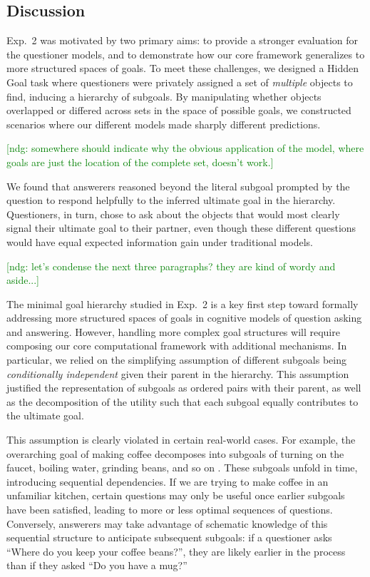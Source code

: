 \documentclass[11pt, floatsintext]{apa6}
\newcommand{\ndg}[1]{\textcolor{Green}{[ndg: #1]}}
\begin{document}
\subsection{Discussion}

Exp.~2 was motivated by two primary aims: to provide a stronger evaluation for the questioner models, and to demonstrate how our core framework generalizes to more structured spaces of goals.
To meet these challenges, we designed a Hidden Goal task where questioners were privately assigned a set of \emph{multiple} objects to find, inducing a hierarchy of subgoals.
By manipulating whether objects overlapped or differed across sets in the space of possible goals, we constructed scenarios where our different models made sharply different predictions. 

\ndg{somewhere should indicate why the obvious application of the model, where goals are just the location of the complete set, doesn't work.}

We found that answerers reasoned beyond the literal subgoal prompted by the question to respond helpfully to the inferred ultimate goal in the hierarchy.
Questioners, in turn, chose to ask about the objects that would most clearly signal their ultimate goal to their partner, even though these different questions would have equal expected information gain under traditional models. 

\ndg{let's condense the next three paragraphs? they are kind of wordy and aside...}

The minimal goal hierarchy studied in Exp.~2 is a key first step toward formally addressing more structured spaces of goals in cognitive models of question asking and answering. 
However, handling more complex goal structures will require composing our core computational framework with additional mechanisms.
In particular, we relied on the simplifying assumption of different subgoals being \emph{conditionally independent} given their parent in the hierarchy. 
This assumption justified the representation of subgoals as ordered pairs with their parent, as well as the decomposition of the utility such that each subgoal equally contributes to the ultimate goal. 

This assumption is clearly violated in certain real-world cases.
For example, the overarching goal of making coffee decomposes into subgoals of turning on the faucet, boiling water, grinding beans, and so on \cite{jackendoff2007language}. 
These subgoals unfold in time, introducing sequential dependencies.
If we are trying to make coffee in an unfamiliar kitchen, certain questions may only be useful once earlier subgoals have been satisfied, leading to more or less optimal sequences of questions.
Conversely, answerers may take advantage of schematic knowledge of this sequential structure to anticipate subsequent subgoals: if a questioner asks ``Where do you keep your coffee beans?'', they are likely earlier in the process than if they asked ``Do you have a mug?'' 
\end{document}
